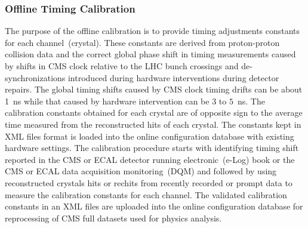 \subsubsection{Offline Timing Calibration}
The purpose of the offline calibration is to provide timing adjustments constants for each channel~(crystal). %
 These constants are derived from  proton-proton collision data and the correct global phase shift in timing measurements caused by shifts in CMS clock relative to the LHC bunch crossings and de-synchronizations introduced during hardware interventions  during detector repairs. The global timing shifts caused by CMS clock timing drifts can be about 1~ns while that caused by hardware intervention can be $3$ to $5$~ns. The calibration constants obtained for each crystal are of opposite sign to the average time measured from the reconstructed hits of each crystal.
The constants kept in XML files format is loaded into the online configuration database with existing hardware settings. The calibration procedure starts with identifying  timing shift reported in the CMS or ECAL detector running electronic~(e-Log) book or the CMS or ECAL data acquisition monitoring~(DQM) and followed by using  reconstructed crystals hits or rechits from recently recorded or prompt data to measure the calibration constants for each channel. The validated calibration constants in an XML files are uploaded into the online configuration database for reprocessing of CMS full datasets used for physics analysis.
